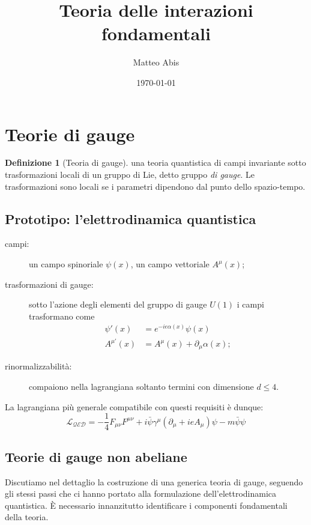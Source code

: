 \documentclass[italian,a4paper]{article}
\title{Teoria delle interazioni fondamentali}
\author{Matteo Abis}
\date{\today}
\theoremstyle{definition}
\newtheorem*{definition}{Definizione}
\newcommand{\dimu}{\ensuremath{\partial_{\mu}}}
\renewcommand{\leq}{\leqslant}
\begin{document}
\maketitle

\section{Teorie di gauge}
\begin{definition}[Teoria di gauge] una teoria quantistica di campi
    invariante sotto trasformazioni locali di un gruppo di Lie, detto gruppo
    \emph{di gauge}. Le trasformazioni sono locali se i parametri dipendono
    dal punto dello spazio-tempo.
\end{definition}

\subsection{Prototipo: l'elettrodinamica quantistica}
\begin{description}
    \item[campi:] un campo spinoriale $\psi(x)$, un campo vettoriale
        $A^{\mu}(x)$;
    \item[trasformazioni di gauge:] sotto l'azione degli elementi del gruppo
        di gauge $U(1)$ i campi trasformano come
        \begin{align*}
            \psi'(x) &= e^{-ie\alpha(x)}\psi(x)\\
            A^{\mu'}(x) &= A^{\mu}(x) + \dimu \alpha(x);
        \end{align*}
    \item[rinormalizzabilit\`a:] compaiono nella lagrangiana soltanto
        termini con dimensione $d \leq 4$.
\end{description}

La lagrangiana pi\`u generale compatibile con questi requisiti \`e dunque:
\begin{equation*}
    \mathscr{L_{\text{QED}}} = -\dfrac{1}{4}F_{\mu\nu}F^{\mu\nu} + i
    \bar{\psi}\gamma^{\mu}(\dimu + i e A_{\mu})\psi - m
    \bar{\psi}\psi
\end{equation*}

\subsection{Teorie di gauge non abeliane}\label{teorie_di_gauge}
Discutiamo nel dettaglio la costruzione di una generica teoria di gauge,
seguendo gli stessi passi che ci hanno portato alla formulazione
dell'elettrodinamica quantistica. \`E necessario innanzitutto identificare i
componenti fondamentali della teoria.
\end{document}
